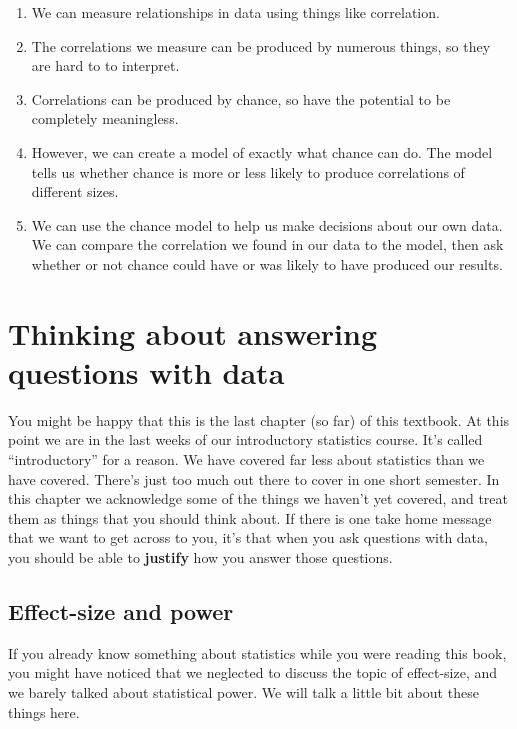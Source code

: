 \documentclass[
]{book}
\providecommand{\tightlist}{%
  \setlength{\itemsep}{0pt}\setlength{\parskip}{0pt}}
\begin{document}
\begin{enumerate}
\def\labelenumi{\arabic{enumi}.}
\tightlist
\item
  We can measure relationships in data using things like correlation.
\item
  The correlations we measure can be produced by numerous things, so they are hard to to interpret.
\item
  Correlations can be produced by chance, so have the potential to be completely meaningless.
\item
  However, we can create a model of exactly what chance can do. The model tells us whether chance is more or less likely to produce correlations of different sizes.
\item
  We can use the chance model to help us make decisions about our own data. We can compare the correlation we found in our data to the model, then ask whether or not chance could have or was likely to have produced our results.
\end{enumerate}

\chapter{Thinking about answering questions with data}\label{thinking-about-answering-questions-with-data}

You might be happy that this is the last chapter (so far) of this textbook. At this point we are in the last weeks of our introductory statistics course. It's called ``introductory'' for a reason. We have covered far less about statistics than we have covered. There's just too much out there to cover in one short semester. In this chapter we acknowledge some of the things we haven't yet covered, and treat them as things that you should think about. If there is one take home message that we want to get across to you, it's that when you ask questions with data, you should be able to \textbf{justify} how you answer those questions.

\section{Effect-size and power}\label{effect-size-and-power}

If you already know something about statistics while you were reading this book, you might have noticed that we neglected to discuss the topic of effect-size, and we barely talked about statistical power. We will talk a little bit about these things here.
\end{document}
